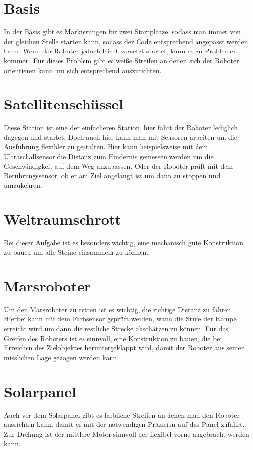 \documentclass[
    DIV=calc,
    IMRAD=false,
	ngerman,
	accentcolor=1c,%
	marginpar=false,
	identbarcolor=1c,
	]{tudapub}
\begin{document}
\section{Basis}
In der Basis gibt es Markierungen f\"ur zwei Startpl\"atze, sodass man immer von der gleichen Stelle starten kann, sodass der Code entsprechend angepasst werden kann.\newline
Wenn der Roboter jedoch leicht versetzt startet, kann es zu Problemen kommen. F\"ur dieses Problem gibt es wei\ss{}e Streifen an denen sich der Roboter orientieren kann um sich entsprechend auszurichten.

\section{Satellitensch\"ussel}
Diese Station ist eine der einfacheren Station, hier f\"ahrt der Roboter lediglich dagegen und startet. Doch auch hier kann man mit Sensoren arbeiten um die Ausf\"uhrung flexibler zu gestalten. Hier kann beispielsweise mit dem Ultraschallsensor die Distanz zum Hindernis gemessen werden um die Geschwindigkeit auf dem Weg anzupassen. Oder der Roboter pr\"uft mit dem Ber\"uhrungssensor, ob er am Ziel angelangt ist um dann zu stoppen und umzukehren.

\section{Weltraumschrott}
Bei dieser Aufgabe ist es besonders wichtig, eine mechanisch gute Konstruktion zu bauen um alle Steine einsammeln zu k\"onnen.

\section{Marsroboter}
Um den Marsroboter zu retten ist es wichtig, die richtige Distanz zu fahren. Hierbei kann mit dem Farbsensor gepr\"uft werden, wann die Stufe der Rampe erreicht wird um dann die restliche Strecke absch\"atzen zu k\"onnen. F\"ur das Greifen des Roboters ist es sinnvoll, eine Konstruktion zu bauen, die bei Erreichen des Zielobjektes heruntergeklappt wird, damit der Roboter aus seiner misslichen Lage gezogen werden kann.

\section{Solarpanel}
Auch vor dem Solarpanel gibt es farbliche Streifen an denen man den Roboter ausrichten kann, damit er mit der notwendigen Pr\"azision auf das Panel zuf\"ahrt. Zur Drehung ist der mittlere Motor sinnvoll der flexibel vorne angebracht werden kann.
\end{document}
